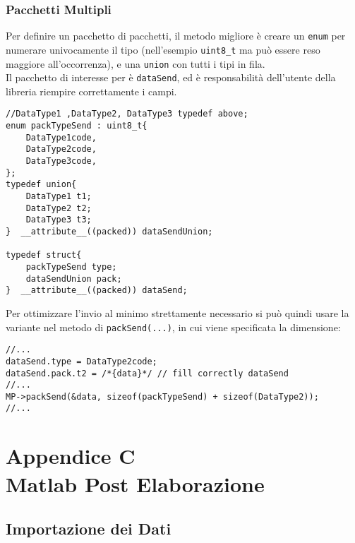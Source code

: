 \subsection{Pacchetti Multipli}
Per definire un pacchetto di pacchetti, il metodo migliore è creare un \verb|enum| per numerare univocamente il tipo (nell'esempio \verb|uint8_t| ma può essere reso maggiore all'occorrenza), e una \verb|union| con tutti i tipi in fila.\\
Il pacchetto di interesse per  è \verb|dataSend|, ed è responsabilità dell'utente della libreria riempire correttamente i campi.\\
\begin{lstlisting}[style=cppStyle,caption={Definizione Pacchetti Multipli},label=lst:EMPmultiplePack] 
//DataType1 ,DataType2, DataType3 typedef above;
enum packTypeSend : uint8_t{
	DataType1code,
	DataType2code,
	DataType3code,
};
typedef union{
	DataType1 t1;
	DataType2 t2;
	DataType3 t3;
}  __attribute__((packed)) dataSendUnion;

typedef struct{
	packTypeSend type;
	dataSendUnion pack;
}  __attribute__((packed)) dataSend;
\end{lstlisting}
\noindent
Per ottimizzare l'invio al minimo strettamente necessario si può quindi usare la variante nel metodo di \verb|packSend(...)|, in cui viene specificata la dimensione:

\begin{lstlisting}[style=cppStyle,caption={Definizione Pacchetti Multipli},label=lst:EMPsendOptimize] 
//...
dataSend.type = DataType2code;
dataSend.pack.t2 = /*{data}*/ // fill correctly dataSend
//...    
MP->packSend(&data, sizeof(packTypeSend) + sizeof(DataType2));
//...
\end{lstlisting}


\chapter*{Appendice C\\ Matlab Post Elaborazione}\label{MatlabCode}
\setcounter{chapter}{\thechapter + 1}

\section{Importazione dei Dati}
